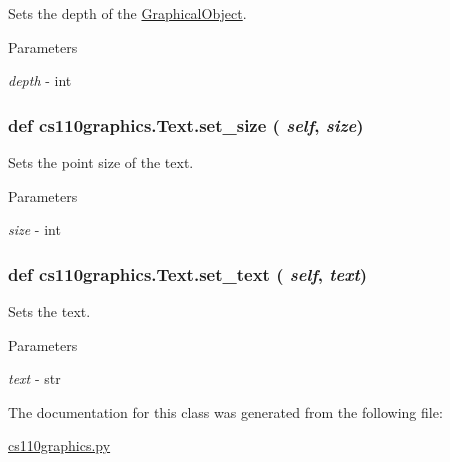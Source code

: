 Sets the depth of the \hyperlink{classcs110graphics_1_1GraphicalObject}{GraphicalObject}. 
\begin{DoxyParams}{Parameters}
\item[{\em depth}]-\/ int \end{DoxyParams}
\hypertarget{classcs110graphics_1_1Text_ad470aa26235fc2f5f1459c3750251207}{
\subsubsection[{set\_\-size}]{\setlength{\rightskip}{0pt plus 5cm}def cs110graphics.Text.set\_\-size ( {\em self}, \/   {\em size})}}
\label{classcs110graphics_1_1Text_ad470aa26235fc2f5f1459c3750251207}


Sets the point size of the text. 
\begin{DoxyParams}{Parameters}
\item[{\em size}]-\/ int \end{DoxyParams}
\hypertarget{classcs110graphics_1_1Text_ab12aa7478ca6a2b2015b7e8544674c73}{
\subsubsection[{set\_\-text}]{\setlength{\rightskip}{0pt plus 5cm}def cs110graphics.Text.set\_\-text ( {\em self}, \/   {\em text})}}
\label{classcs110graphics_1_1Text_ab12aa7478ca6a2b2015b7e8544674c73}


Sets the text. 
\begin{DoxyParams}{Parameters}
\item[{\em text}]-\/ str \end{DoxyParams}


The documentation for this class was generated from the following file:\begin{DoxyCompactItemize}
\item 
\hyperlink{cs110graphics_8py}{cs110graphics.py}\end{DoxyCompactItemize}
